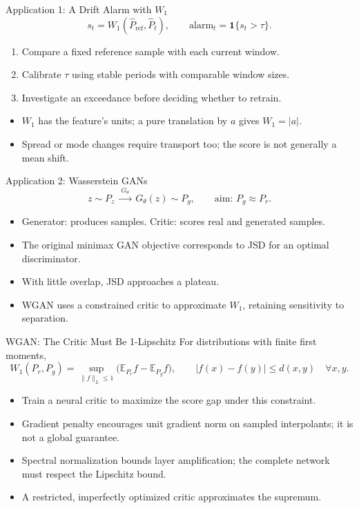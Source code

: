 \documentclass[10pt,aspectratio=169]{ntuabeamer}
\newcommand{\E}{\mathbb{E}}
\begin{document}
	\begin{frame}{Application 1: A Drift Alarm with $W_1$}
\small
\[
 s_t=W_1(\widehat P_{\mathrm{ref}},\widehat P_t),\qquad
 \mathrm{alarm}_t=\mathbf1\{s_t>\tau\}.
\]
\begin{enumerate}
\item Compare a fixed reference sample with each current window.
\item Calibrate $\tau$ using stable periods with comparable window sizes.
\item Investigate an exceedance before deciding whether to retrain.
\end{enumerate}
\begin{itemize}
\item $W_1$ has the feature's units; a pure translation by $a$ gives $W_1=|a|$.
\item Spread or mode changes require transport too; the score is not generally a mean shift.
\end{itemize}
\end{frame}

	\begin{frame}{Application 2: Wasserstein GANs}
\small
\[
 z\sim P_z\ \xrightarrow{\ G_\theta\ }\ G_\theta(z)\sim P_g,
 \qquad\text{aim: }P_g\approx P_r.
\]
\begin{itemize}
\item Generator: produces samples. Critic: scores real and generated samples.
\item The original minimax GAN objective corresponds to JSD for an optimal discriminator.
\item With little overlap, JSD approaches a plateau.
\item WGAN uses a constrained critic to approximate $W_1$, retaining sensitivity to separation.
\end{itemize}
\end{frame}

	\begin{frame}{WGAN: The Critic Must Be 1-Lipschitz}
\small
For distributions with finite first moments,
\[
 W_1(P_r,P_g)=\sup_{\|f\|_L\le1}\big(\E_{P_r}f-\E_{P_g}f\big),\qquad
 |f(x)-f(y)|\le d(x,y)\quad\forall x,y.
\]
\begin{itemize}
\item Train a neural critic to maximize the score gap under this constraint.
\item Gradient penalty encourages unit gradient norm on sampled interpolants; it is not a global guarantee.
\item Spectral normalization bounds layer amplification; the complete network must respect the Lipschitz bound.
\item A restricted, imperfectly optimized critic approximates the supremum.
\end{itemize}
\end{frame}
\end{document}
